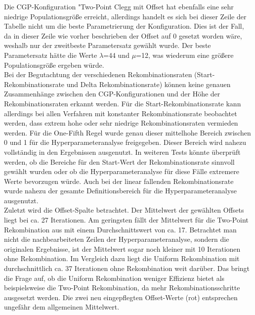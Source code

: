 Die CGP-Konfiguration "Two-Point Clegg mit Offset hat ebenfalls eine sehr niedrige Populationsgröße erreicht, allerdings handelt es sich bei dieser Zeile der Tabelle nicht um die beste Parametrierung der Konfiguration.
Dies ist der Fall, da in dieser Zeile wie vorher beschrieben der Offset auf 0 gesetzt worden wäre, weshalb nur der zweitbeste Parametersatz gewählt wurde.
Der beste Parametersatz hätte die Werte $\lambda$=44 und $\mu$=12, was wiederum eine größere Populationsgröße ergeben würde.\\
Bei der Begutachtung der verschiedenen Rekombinationsraten (Start-Rekombinationsrate und Delta Rekombinationsrate) können keine genauen Zusammenhänge zwischen den CGP-Konfigurationen und der Höhe der Rekombinationsraten erkannt werden.
Für die Start-Rekombinationsrate kann allerdings bei allen Verfahren mit konstanter Rekombinationsrate beobachtet werden, dass extrem hohe oder sehr niedrige Rekombinationsraten vermieden werden.
Für die One-Fifth Regel wurde genau dieser mittelhohe Bereich zwischen 0 und 1 für die Hyperparameteranalyse freigegeben.
Dieser Bereich wird nahezu vollständig in den Ergebnissen ausgenutzt.
In weiteren Tests könnte überprüft werden, ob die Bereiche für den Start-Wert der Rekombinationsrate sinnvoll gewählt wurden oder ob die Hyperparameteranalyse für diese Fälle extremere Werte bevorzugen würde.
Auch bei der linear fallenden Rekombinationsrate wurde nahezu der gesamte Definitionsbereich für die Hyperparameteranalyse ausgenutzt.\\
Zuletzt wird die Offset-Spalte betrachtet.
Der Mittelwert der gewählten Offsets liegt bei ca. 27 Iterationen.
Am geringsten fällt der Mittelwert für die Two-Point Rekombination aus mit einem Durchschnittswert von ca. 17.
Betrachtet man nicht die nachbearbeiteten Zeilen der Hyperparameteranalyse, sondern die originalen Ergebnisse, ist der Mittelwert sogar noch kleiner mit 10 Iterationen ohne Rekombination.
Im Vergleich dazu liegt die Uniform Rekombination mit durchschnittlich ca. 37 Iterationen ohne Rekombination weit darüber.
Das bringt die Frage auf, ob die Uniform Rekombination weniger Effizienz bietet als beispielsweise die Two-Point Rekombination, da mehr Rekombinationsschritte ausgesetzt werden.
Die zwei neu eingepflegten Offset-Werte (rot) entsprechen ungefähr dem allgemeinen Mittelwert.

